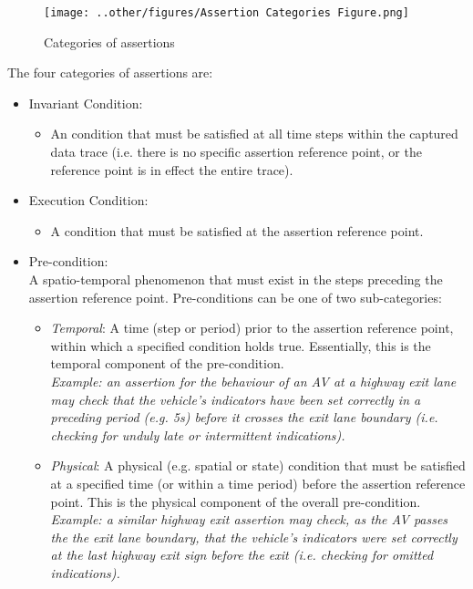 \begin{figure}[h!]
    \centering
    \texttt{[image: ..other/figures/Assertion Categories Figure.png]}
    \caption{Categories of assertions}
    \label{fig:categories_of_assertions}
\end{figure}


The four categories of assertions are:
\begin{itemize}
    \item Invariant Condition:
    \begin{itemize}
        \item An condition that must be satisfied at all time steps within the captured data trace (i.e. there is no specific assertion reference point, or the reference point is in effect the entire trace).
    \end{itemize}
     \item Execution Condition:
    \begin{itemize}
        \item A condition that must be satisfied at the assertion reference point.
    \end{itemize}
    \item Pre-condition: \\
    A spatio-temporal phenomenon that must exist in the steps preceding the assertion reference point. Pre-conditions can be one of two sub-categories:
    \begin{itemize}
        \item \textit{Temporal}: A time (step or period) prior to the assertion reference point, within which a specified condition holds true. Essentially, this is the temporal component of the pre-condition.\\
        \textit{Example: an assertion for the behaviour of an AV at a highway exit lane may check that the vehicle's indicators have been set correctly in a preceding period (e.g. 5s) before it crosses the exit lane boundary (i.e. checking for unduly late or intermittent indications).}
        \item \textit{Physical}: A physical (e.g. spatial or state) condition that must be satisfied at a specified time (or within a  time period) before the assertion reference point. This is the physical component of the overall pre-condition.\\
        \textit{Example: a similar highway exit assertion may check, as the AV passes the the exit lane boundary, that the vehicle's indicators were set correctly at the last highway exit sign before the exit (i.e. checking for omitted indications).}

\end{itemize}
\end{itemize}
